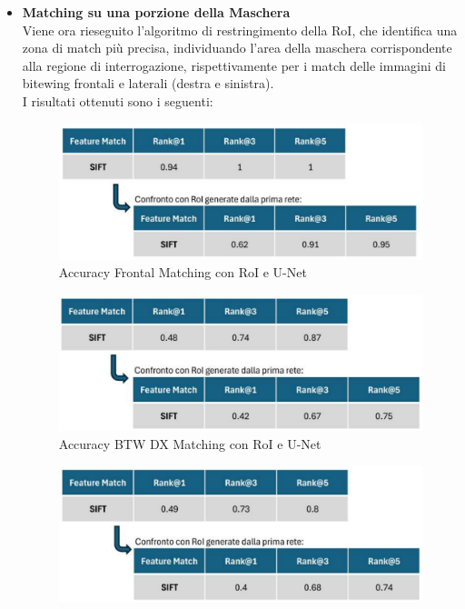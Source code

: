 \documentclass[12pt,a4paper,openright,twoside]{book}
\begin{document}
\begin{itemize}
\item \textbf{Matching su una porzione della Maschera}\\
Viene ora rieseguito l'algoritmo di restringimento della RoI, che identifica una zona di match più precisa, individuando l'area della maschera corrispondente alla regione di interrogazione, rispettivamente per i match delle immagini di bitewing frontali e laterali (destra e sinistra).\\
I risultati ottenuti sono i seguenti:
\begin{figure}[H]
	\centering
	\includegraphics{figures/frontal5_1.pdf}
   	\caption{Accuracy Frontal Matching con RoI e U-Net}
	\label{fig:frontal5}
\end{figure}
\begin{figure}[H]
	\centering
	\includegraphics{figures/dx5_1.pdf}
    	\caption{Accuracy BTW DX Matching con RoI e U-Net}
	\label{fig:dx5}
\end{figure}
\begin{figure}[H]
	\centering
	\includegraphics{figures/sx5_1.pdf}

\end{figure}
\end{itemize}
\end{document}
